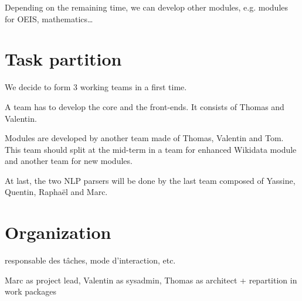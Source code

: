 \documentclass[a4paper,10pt]{article}
\begin{document}
Depending on the remaining time, we can develop other modules, e.g. modules for OEIS, mathematics\ldots

\section{Task partition}

We decide to form 3 working teams in a first time.

A team has to develop the core and the front-ends. It consists of Thomas and Valentin.

Modules are developed by another team made of Thomas, Valentin and Tom. This team should split at the mid-term in a team for enhanced Wikidata module and another team for new modules.

At last, the two NLP parsers will be done by the last team composed of Yassine, Quentin, Raphaël and Marc.


\section{Organization}

responsable des tâches, mode d’interaction, etc.

Marc as project lead, Valentin as sysadmin, Thomas as architect + repartition in work packages

\end{document}
